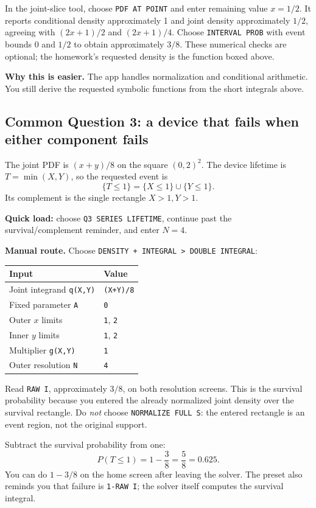 In the joint-slice tool, choose \texttt{PDF AT POINT} and enter remaining value $x=1/2$. It reports conditional density approximately 1 and joint density approximately $1/2$, agreeing with $(2x+1)/2$ and $(2x+1)/4$. Choose \texttt{INTERVAL PROB} with event bounds 0 and $1/2$ to obtain approximately $3/8$. These numerical checks are optional; the homework's requested density is the function boxed above.

\textbf{Why this is easier.} The app handles normalization and conditional arithmetic. You still derive the requested symbolic functions from the short integrals above.

\clearpage
\subsection{Common Question 3: a device that fails when either component fails}
The joint PDF is $(x+y)/8$ on the square $(0,2)^2$. The device lifetime is $T=\min(X,Y)$, so the requested event is
\[
\{T\le1\}=\{X\le1\}\cup\{Y\le1\}.
\]
Its complement is the single rectangle $X>1,Y>1$.

\textbf{Quick load:} choose \texttt{Q3 SERIES LIFETIME}, continue past the survival/complement reminder, and enter $N=4$.\par
\textbf{Manual route.} Choose \texttt{DENSITY + INTEGRAL > DOUBLE INTEGRAL}:
\begin{center}
\begin{tabular}{@{}ll@{}}
\toprule Input & Value\\\midrule
Joint integrand \texttt{q(X,Y)} & \texttt{(X+Y)/8}\\
Fixed parameter \texttt{A} & \texttt{0}\\
Outer $x$ limits & \texttt{1}, \texttt{2}\\
Inner $y$ limits & \texttt{1}, \texttt{2}\\
Multiplier \texttt{g(X,Y)} & \texttt{1}\\
Outer resolution \texttt{N} & \texttt{4}\\\bottomrule
\end{tabular}
\end{center}
Read \texttt{RAW I}, approximately $3/8$, on both resolution screens. This is the survival probability because you entered the already normalized joint density over the survival rectangle. Do \emph{not} choose \texttt{NORMALIZE FULL S}: the entered rectangle is an event region, not the original support.

Subtract the survival probability from one:
\[
\boxed{P(T\le1)=1-\frac38=\frac58=0.625.}
\]
You can do $1-3/8$ on the home screen after leaving the solver. The preset also reminds you that failure is \texttt{1-RAW I}; the solver itself computes the survival integral.

